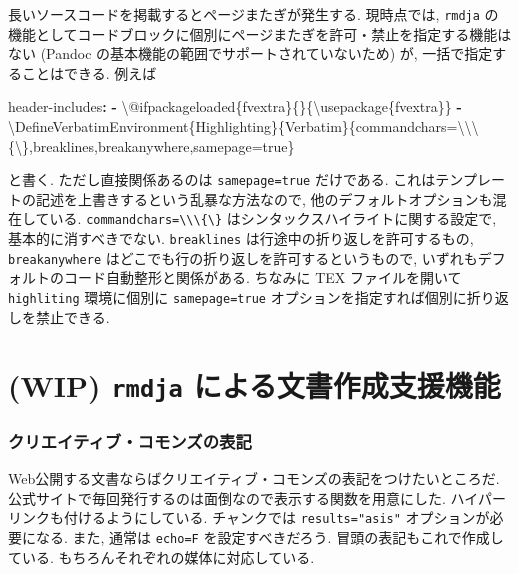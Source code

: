 \documentclass[
  xelatex,ja=standard,jafont=noto]{bxjsbook}
\newenvironment{Shaded}{\begin{snugshade}}{\end{snugshade}}
\newcommand{\AttributeTok}[1]{\textcolor[rgb]{0.77,0.63,0.00}{#1}}
\newcommand{\FunctionTok}[1]{\textcolor[rgb]{0.00,0.00,0.00}{#1}}
\newcommand{\KeywordTok}[1]{\textcolor[rgb]{0.13,0.29,0.53}{\textbf{#1}}}
\theoremstyle{definition}
\theoremstyle{definition}
\theoremstyle{definition}
\theoremstyle{definition}
\theoremstyle{remark}
\begin{document}
長いソースコードを掲載するとページまたぎが発生する. 現時点では,
\texttt{rmdja}
の機能としてコードブロックに個別にページまたぎを許可・禁止を指定する機能はない
(Pandoc の基本機能の範囲でサポートされていないため) が,
一括で指定することはできる. 例えば

\begin{Shaded}
\begin{Highlighting}[]
\FunctionTok{header{-}includes}\KeywordTok{:}
\AttributeTok{  }\KeywordTok{{-}}\AttributeTok{ \textbackslash{}@ifpackageloaded\{fvextra\}\{\}\{\textbackslash{}usepackage\{fvextra\}\}}
\AttributeTok{  }\KeywordTok{{-}}\AttributeTok{ \textbackslash{}DefineVerbatimEnvironment\{Highlighting\}\{Verbatim\}\{commandchars=\textbackslash{}\textbackslash{}\textbackslash{}\{\textbackslash{}\},breaklines,breakanywhere,samepage=true\}}
\end{Highlighting}
\end{Shaded}

と書く. ただし直接関係あるのは \texttt{samepage=true} だけである.
これはテンプレートの記述を上書きするという乱暴な方法なので,
他のデフォルトオプションも混在している.
\texttt{commandchars=\textbackslash{}\textbackslash{}\textbackslash{}\{\textbackslash{}\}}
はシンタックスハイライトに関する設定で, 基本的に消すべきでない.
\texttt{breaklines} は行途中の折り返しを許可するもの,
\texttt{breakanywhere} はどこでも行の折り返しを許可するというもので,
いずれもデフォルトのコード自動整形と関係がある. ちなみに TEX
ファイルを開いて \texttt{highliting} 環境に個別に \texttt{samepage=true}
オプションを指定すれば個別に折り返しを禁止できる.

\hypertarget{wip-rmdja-ux306bux3088ux308bux6587ux66f8ux4f5cux6210ux652fux63f4ux6a5fux80fd}{%
\chapter{\texorpdfstring{(WIP) \texttt{rmdja}
による文書作成支援機能}{(WIP) rmdja による文書作成支援機能}}\label{wip-rmdja-ux306bux3088ux308bux6587ux66f8ux4f5cux6210ux652fux63f4ux6a5fux80fd}}

\hypertarget{ux30afux30eaux30a8ux30a4ux30c6ux30a3ux30d6ux30b3ux30e2ux30f3ux30baux306eux8868ux8a18}{%
\subsection{クリエイティブ・コモンズの表記}\label{ux30afux30eaux30a8ux30a4ux30c6ux30a3ux30d6ux30b3ux30e2ux30f3ux30baux306eux8868ux8a18}}

Web公開する文書ならばクリエイティブ・コモンズの表記をつけたいところだ.
公式サイトで毎回発行するのは面倒なので表示する関数を用意にした.
ハイパーリンクも付けるようにしている. チャンクでは
\texttt{results="asis"} オプションが必要になる. また, 通常は
\texttt{echo=F} を設定すべきだろう. 冒頭の表記もこれで作成している.
もちろんそれぞれの媒体に対応している.
\end{document}

